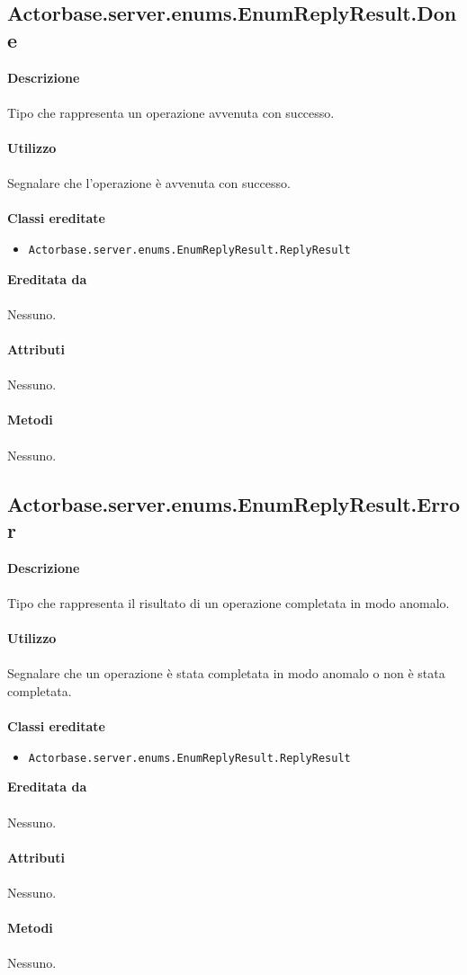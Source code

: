 \documentclass[a4paper]{article}
\begin{document}
			
	\subsection{Actorbase.server.enums.EnumReplyResult.Done}
		\textbf{Descrizione}
			\\ \\
				Tipo che rappresenta un operazione avvenuta con successo.
			\\ \\
		\textbf{Utilizzo}
			\\ \\
				Segnalare che l'operazione è avvenuta con successo.
			\\ \\
		\textbf{Classi ereditate}
			\begin{itemize}
				\item \texttt{Actorbase.server.enums.EnumReplyResult.ReplyResult}
			\end{itemize}
		\textbf{Ereditata da}
		\\ \\
		Nessuno.
		\\ \\
		\textbf{Attributi}
		\\ \\
		Nessuno.
		\\ \\
		\textbf{Metodi}
			\\ \\
			Nessuno.
			
	\subsection{Actorbase.server.enums.EnumReplyResult.Error}
		\textbf{Descrizione}
			\\ \\
			Tipo che rappresenta il risultato di un operazione completata in modo anomalo.
			\\ \\
		\textbf{Utilizzo}
			\\ \\
			Segnalare che un operazione è stata completata in modo anomalo o non è stata completata.
			\\ \\
		\textbf{Classi ereditate}
			\begin{itemize}
				\item \texttt{Actorbase.server.enums.EnumReplyResult.ReplyResult}
			\end{itemize}
		\textbf{Ereditata da}
		\\ \\
		Nessuno.
		\\ \\
		\textbf{Attributi}
		\\ \\
			Nessuno.
		\\ \\
		\textbf{Metodi}
			\\ \\
			Nessuno.
			
\end{document}
